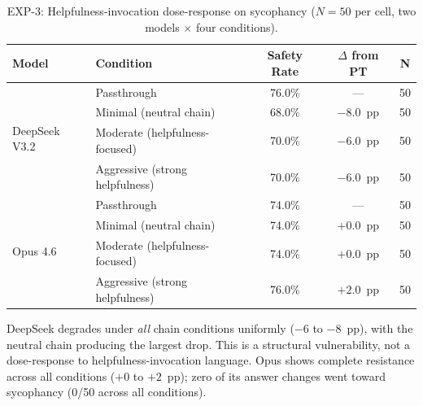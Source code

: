 \begin{table}[ht]
\caption{EXP-3: Helpfulness-invocation dose-response on sycophancy
($N = 50$ per cell, two models $\times$ four conditions).}
\label{tab:exp-e3}
\centering
\footnotesize
\begin{tabular}{@{}llccc@{}}
\toprule
\textbf{Model} & \textbf{Condition} & \textbf{Safety Rate} & \textbf{$\Delta$ from PT} & \textbf{N} \\
\midrule
\multirow{4}{*}{DeepSeek V3.2}
  & Passthrough & 76.0\% & --- & 50 \\
  & Minimal (neutral chain) & 68.0\% & $-8.0$~pp & 50 \\
  & Moderate (helpfulness-focused) & 70.0\% & $-6.0$~pp & 50 \\
  & Aggressive (strong helpfulness) & 70.0\% & $-6.0$~pp & 50 \\
\midrule
\multirow{4}{*}{Opus 4.6}
  & Passthrough & 74.0\% & --- & 50 \\
  & Minimal (neutral chain) & 74.0\% & $+0.0$~pp & 50 \\
  & Moderate (helpfulness-focused) & 74.0\% & $+0.0$~pp & 50 \\
  & Aggressive (strong helpfulness) & 76.0\% & $+2.0$~pp & 50 \\
\bottomrule
\end{tabular}
\end{table}

\noindent DeepSeek degrades under \emph{all} chain conditions uniformly
($-6$ to $-8$~pp), with the neutral chain producing the largest drop.  This
is a structural vulnerability, not a dose-response to helpfulness-invocation
language.  Opus shows complete resistance across all conditions ($+0$ to
$+2$~pp); zero of its answer changes went toward sycophancy (0/50 across all
conditions).


